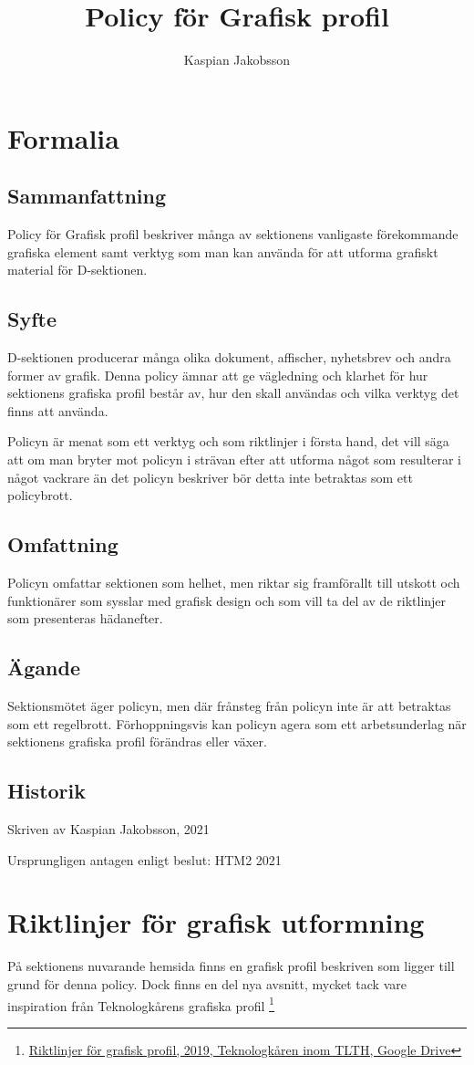 \documentclass[]{dsekkallelse}
\title{Policy för Grafisk profil}
\author{Kaspian Jakobsson}
\begin{document}
\section{Formalia}

\subsection{Sammanfattning}
Policy för Grafisk profil beskriver många av sektionens vanligaste förekommande grafiska element samt verktyg som man kan använda för att utforma grafiskt material för D-sektionen.

\subsection{Syfte}
D-sektionen producerar många olika dokument, affischer, nyhetsbrev och andra former av grafik. Denna policy ämnar att ge vägledning och klarhet för hur sektionens grafiska profil består av, hur den skall användas och vilka verktyg det finns att använda.

Policyn är menat som ett verktyg och som riktlinjer i första hand, det vill säga att om man bryter mot policyn i strävan efter att utforma något som resulterar i något vackrare än det policyn beskriver bör detta inte betraktas som ett policybrott.

\subsection{Omfattning}
Policyn omfattar sektionen som helhet, men riktar sig framförallt till utskott och funktionärer som sysslar med grafisk design och som vill ta del av de riktlinjer som presenteras hädanefter.

\subsection{Ägande}
Sektionsmötet äger policyn, men där frånsteg från policyn inte är att betraktas som ett regelbrott. Förhoppningsvis kan policyn agera som ett arbetsunderlag när sektionens grafiska profil förändras eller växer.


\subsection{Historik}
Skriven av Kaspian Jakobsson, 2021

Ursprungligen antagen enligt beslut:
HTM2 2021


\section{Riktlinjer för grafisk utformning}
På sektionens nuvarande hemsida finns en grafisk profil beskriven som ligger till grund för denna policy. Dock finns en del nya avsnitt, mycket tack vare inspiration från Teknologkårens grafiska profil \footnote{\href{https://drive.google.com/file/d/1EFdTyU6aXKSBEj4cqcDsR325LMzTP_um/view}{Riktlinjer för grafisk profil, 2019, Teknologkåren inom TLTH, Google Drive}}
\end{document}
